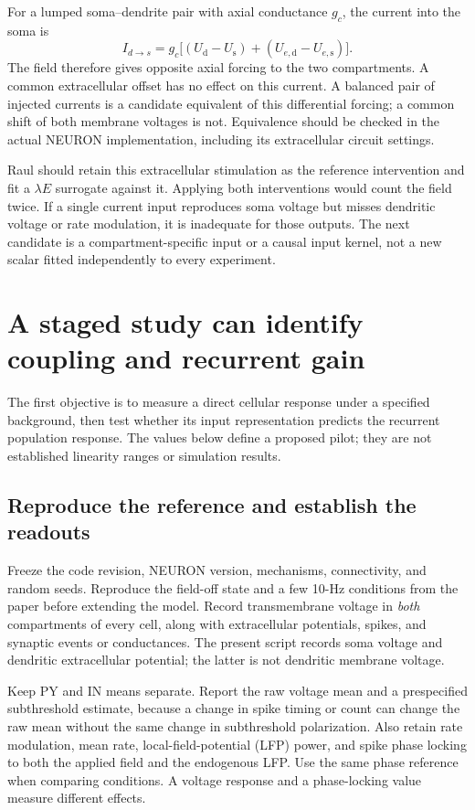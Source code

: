 \documentclass[11pt,a4paper]{article}
\begin{document}
For a lumped soma--dendrite pair with axial conductance $g_c$, the current into the soma is
\begin{equation}
I_{d\to s}=g_c\big[(U_{\mathrm d}-U_{\mathrm s})+(U_{e,\mathrm d}-U_{e,\mathrm s})\big].
\end{equation}
The field therefore gives opposite axial forcing to the two compartments. A common extracellular offset has no effect on this current. A balanced pair of injected currents is a candidate equivalent of this differential forcing; a common shift of both membrane voltages is not. Equivalence should be checked in the actual NEURON implementation, including its extracellular circuit settings.

Raul should retain this extracellular stimulation as the reference intervention and fit a $\lambda E$ surrogate against it. Applying both interventions would count the field twice. If a single current input reproduces soma voltage but misses dendritic voltage or rate modulation, it is inadequate for those outputs. The next candidate is a compartment-specific input or a causal input kernel, not a new scalar fitted independently to every experiment.

\section{A staged study can identify coupling and recurrent gain}

The first objective is to measure a direct cellular response under a specified background, then test whether its input representation predicts the recurrent population response. The values below define a proposed pilot; they are not established linearity ranges or simulation results.

\subsection{Reproduce the reference and establish the readouts}

Freeze the code revision, NEURON version, mechanisms, connectivity, and random seeds. Reproduce the field-off state and a few 10-Hz conditions from the paper before extending the model. Record transmembrane voltage in \emph{both} compartments of every cell, along with extracellular potentials, spikes, and synaptic events or conductances. The present script records soma voltage and dendritic extracellular potential; the latter is not dendritic membrane voltage.

Keep PY and IN means separate. Report the raw voltage mean and a prespecified subthreshold estimate, because a change in spike timing or count can change the raw mean without the same change in subthreshold polarization. Also retain rate modulation, mean rate, local-field-potential (LFP) power, and spike phase locking to both the applied field and the endogenous LFP. Use the same phase reference when comparing conditions. A voltage response and a phase-locking value measure different effects.
\end{document}
